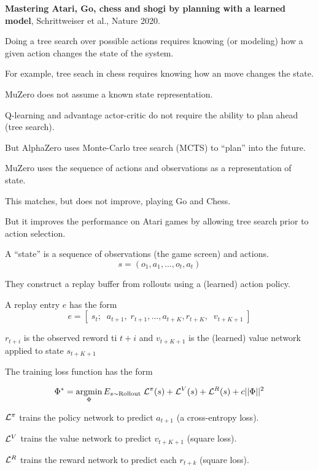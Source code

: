 {

{\bf Mastering Atari, Go, chess and shogi by planning with a learned model}, Schrittweiser et al., Nature 2020.

\vfill
Doing a tree search over possible actions requires knowing (or modeling) how a given action changes the state of the system.

\vfill
For example, tree seach in chess requires knowing how an move changes the state.

\vfill
MuZero does not assume a known state representation.


Q-learning and advantage actor-critic do not require the ability to plan ahead (tree search).

\vfill
But AlphaZero uses Monte-Carlo tree search (MCTS) to ``plan'' into the future.

\vfill
MuZero uses the sequence of actions and observations as a representation of state.

\vfill
This matches, but does not improve, playing Go and Chess.

\vfill
But it improves the performance on Atari games by allowing tree search prior to action selection.


A ``state'' is a sequence of observations (the game screen) and actions.
$$s = (o_1,a_1,\ldots,o_t,a_t)$$

\vfill
They construct a replay buffer from rollouts using a (learned) action policy.

\vfill
A replay entry $e$ has the form
$$e = \left[\;s_t;\;\;a_{t+1},\;r_{t+1},\ldots,a_{t+K},r_{t+K},\;\;v_{t+K+1}\;\right]$$

\vfill
$r_{t+i}$ is the observed reword ti $t+i$ and $v_{t+K+1}$ is the (learned) value network applied to state $s_{t+K+1}$


{\huge
The training loss function has the form

$$\Phi^* = \operatorname*{argmin}_\Phi E_{s \sim \mathrm{Rollout}}\;{\cal L}^\pi(s) + {\cal L}^V(s) +{\cal L}^R(s) + c||\Phi||^2$$
  
\vfill
${\cal L}^\pi$ trains the policy network to predict $a_{t+1}$ (a cross-entropy loss).

\vfill
${\cal L}^V$ trains the value network to predict $v_{t+K+1}$ (square loss).

\vfill
${\cal L}^R$ trains the reward network to predict each $r_{t+k}$ (square loss).
}

}
